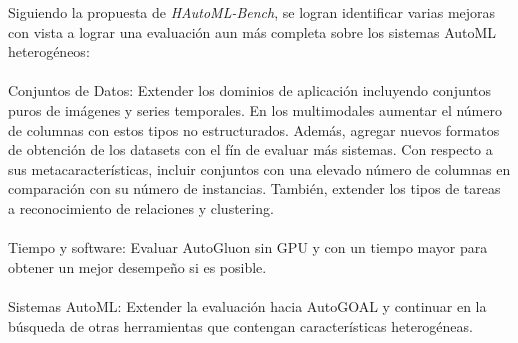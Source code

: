 \begin{recomendations}
Siguiendo la propuesta de \textit{HAutoML-Bench}, se logran identificar varias mejoras con vista a lograr una evaluación aun más completa sobre los 
sistemas AutoML heterogéneos: 
\\
\\
Conjuntos de Datos: Extender los dominios de aplicación incluyendo conjuntos puros de imágenes y series temporales. En los multimodales
aumentar el número de columnas con estos tipos no estructurados. Además, agregar nuevos formatos de obtención de los datasets con el fín de 
evaluar más sistemas. Con respecto a sus metacaracterísticas, incluir conjuntos con una elevado número de columnas en comparación con su número de instancias.
También, extender los tipos de tareas a reconocimiento de relaciones y clustering.
\\
\\
Tiempo y software: Evaluar AutoGluon sin GPU y con un tiempo mayor para obtener un mejor desempeño si es posible.
\\
\\
Sistemas AutoML: Extender la evaluación hacia AutoGOAL y continuar en la búsqueda de otras herramientas que contengan características heterogéneas.

\end{recomendations}
